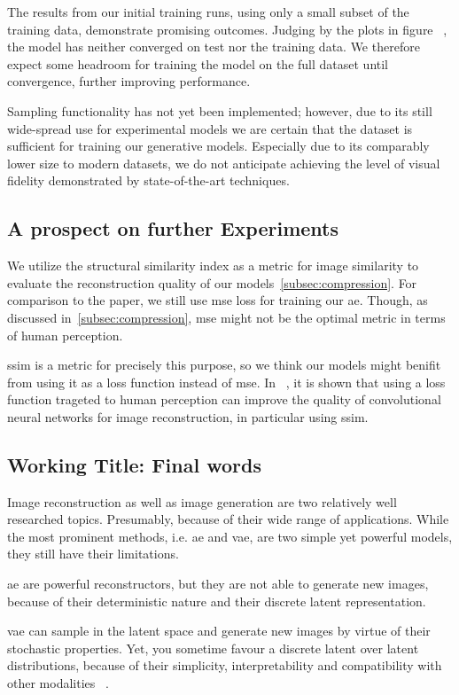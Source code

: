 The results from our initial training runs, using only a small subset of the training data, demonstrate promising
outcomes.
Judging by the plots in figure ~\cite{citationNeeded}, the model has neither converged on test nor the training data.
We therefore expect some headroom for training the model on the full dataset until convergence, further improving
performance.

Sampling functionality has not yet been implemented; however, due to its still wide-spread use for experimental
models we are certain that the dataset is sufficient for training our generative models.
Especially due to its comparably lower size to modern datasets, we do not anticipate achieving the level of visual
fidelity demonstrated by state-of-the-art techniques.

\subsection{A prospect on further Experiments}\label{subsec:further-ideas}
We utilize the structural similarity index as a metric for image similarity to evaluate the reconstruction quality
of our models~\ref{subsec:compression}.
For comparison to the paper, we still use \ac{mse} loss for training our \ac{ae}.
Though, as discussed in~\ref{subsec:compression}, \ac{mse} might not be the optimal metric in terms of human perception.

\ac{ssim} is a metric for precisely this purpose, so we think our models might benifit from using it as a loss
function instead of \ac{mse}.
In ~\cite{ssim_as_loss}, it is shown that using a loss function trageted to human perception can improve the quality
of convolutional neural networks for image reconstruction, in particular using \ac{ssim}.

\subsection{Working Title: Final words}\label{subsec:final-words}
Image reconstruction as well as image generation are two relatively well researched topics.
Presumably, because of their wide range of applications.
While the most prominent methods, i.e. \ac{ae} and \ac{vae}, are two simple yet powerful models, they still have
their limitations.

\ac{ae} are powerful reconstructors, but they are not able to generate new images, because of their deterministic
nature and their discrete latent representation.

\ac{vae} can sample in the latent space and generate new images by virtue of their stochastic properties.
Yet, you sometime favour a discrete latent over latent distributions, because of their simplicity, interpretability
and compatibility with other modalities ~\cite{vqvae}.

